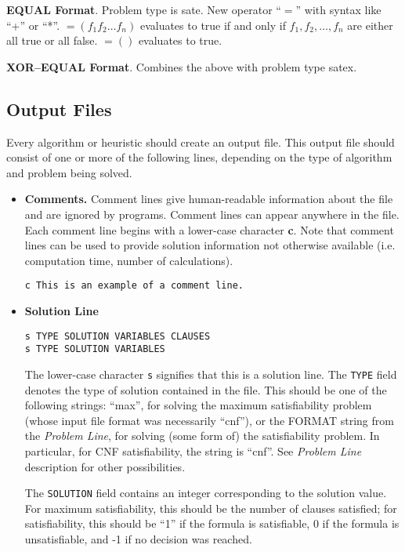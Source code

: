{\bf EQUAL Format}. Problem type is sate.  New operator ``$=$'' with
syntax like ``+'' or ``*''.  $=(f_1 f_2 \ldots f_n)$ evaluates to true
if and only if $f_1,f_2,\ldots,f_n$ are either all true or all false.
$=()$ evaluates to true.

{\bf XOR--EQUAL Format}.  Combines the above with problem type satex.

\subsection{Output Files}
Every algorithm or heuristic should create an output file.  This
output file should consist of one or more of the following lines,
depending on the type of algorithm and problem being solved.

\begin{itemize}

\item {\bf Comments.} Comment lines give human-readable 
information about the file and are ignored by programs.  Comment lines
can appear anywhere in the file.  Each comment line begins with a
lower-case character {\bf c}.  Note that comment lines can be used to
provide solution information not otherwise available (i.e. computation
time, number of calculations).

\begin{verbatim} 
c This is an example of a comment line.
\end{verbatim} 

\item {\bf Solution Line}

\begin{verbatim}
s TYPE SOLUTION VARIABLES CLAUSES
s TYPE SOLUTION VARIABLES
\end{verbatim}
The lower-case character {\tt s} signifies that this is a solution 
line. The {\tt TYPE} field denotes the type of solution contained in
the file.  This should be one of the following strings: ``max'', for
solving the maximum satisfiability problem
(whose input file format was necessarily ``cnf''),
or the FORMAT string from the {\em Problem Line},
for solving (some form of) the satisfiability problem.
In particular, for CNF satisfiability, the string is ``cnf''.
See {\em Problem Line} description for other possibilities.

The {\tt SOLUTION} field contains an integer corresponding
to the solution value.  For maximum satisfiability, this should be the
number of clauses satisfied;  for satisfiability, this should be ``1''
if the formula is satisfiable, 0 if the formula is unsatisfiable,
and -1 if no decision was reached.


\end{itemize}
